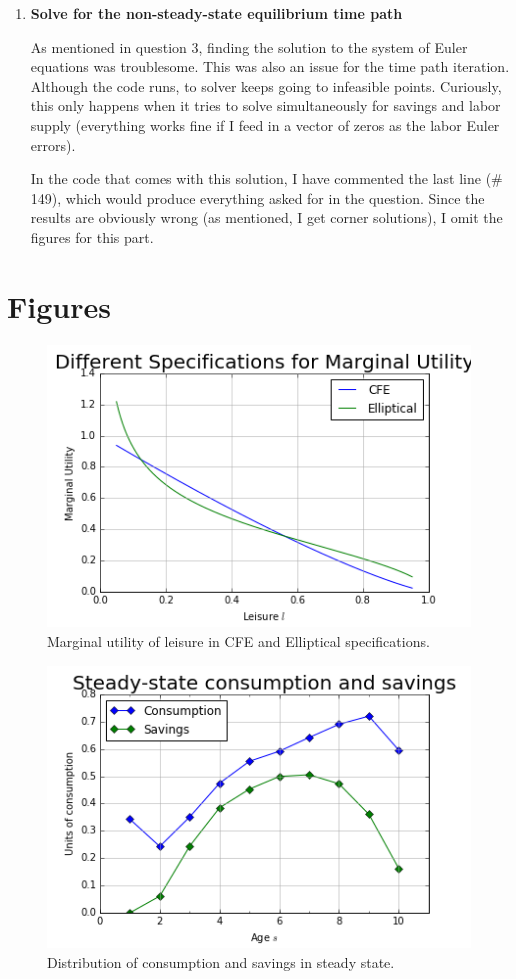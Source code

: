 \documentclass[letterpaper,12pt]{article}
\theoremstyle{definition}
\begin{document}
\begin{enumerate}
	\item \textbf{Solve for the non-steady-state equilibrium time path}
	
	As mentioned in question 3, finding the solution to the system of Euler equations was troublesome. This was also an issue for the time path iteration. Although the code runs, to solver keeps going to infeasible points. Curiously, this only happens when it tries to solve simultaneously for savings and labor supply (everything works fine if I feed in a vector of zeros as the labor Euler errors).
	
	In the code that comes with this solution, I have commented the last line (\# 149), which would produce everything asked for in the question. Since the results are obviously wrong (as mentioned, I get corner solutions), I omit the figures for this part.
\end{enumerate}


\section*{Figures}

\begin{figure}[h!]
	\centering
	\includegraphics[scale=.8]{code/images/utility_leisure}
	\caption{Marginal utility of leisure in CFE and Elliptical specifications.}
	\end{figure}

\begin{figure}[h!]
	\centering
	\includegraphics[scale=.8]{code/images/SS_bc}
	\caption{Distribution of consumption and savings in steady state.}
	\end{figure}
	
\end{document}
